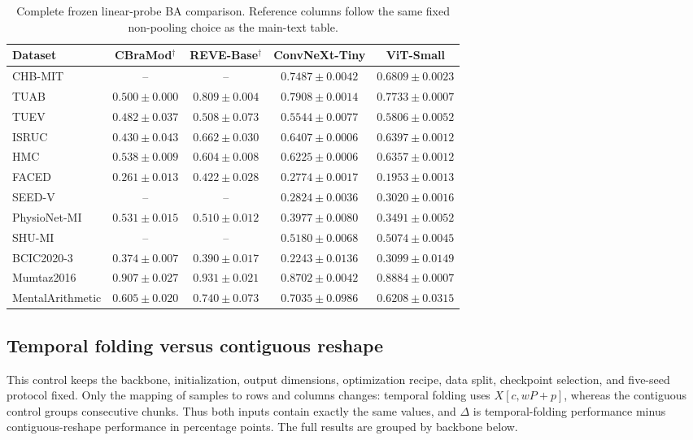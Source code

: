 \begin{table}[tbp]
\centering\scriptsize
\setlength{\tabcolsep}{4pt}
\caption{Complete frozen linear-probe BA comparison. Reference columns follow the same fixed non-pooling choice as the main-text table.}
\label{tab:linear-probe-ba-context}
\begin{tabular}{@{}lcccc@{}}\toprule
Dataset & CBraMod$^\dagger$ & REVE-Base$^\dagger$ & ConvNeXt-Tiny & ViT-Small \\ \midrule
CHB-MIT & -- & -- & $0.7487\pm0.0042$ & $0.6809\pm0.0023$ \\
TUAB & $0.500\pm0.000$ & $0.809\pm0.004$ & $0.7908\pm0.0014$ & $0.7733\pm0.0007$ \\
TUEV & $0.482\pm0.037$ & $0.508\pm0.073$ & $0.5544\pm0.0077$ & $0.5806\pm0.0052$ \\
ISRUC & $0.430\pm0.043$ & $0.662\pm0.030$ & $0.6407\pm0.0006$ & $0.6397\pm0.0012$ \\
HMC & $0.538\pm0.009$ & $0.604\pm0.008$ & $0.6225\pm0.0006$ & $0.6357\pm0.0012$ \\
FACED & $0.261\pm0.013$ & $0.422\pm0.028$ & $0.2774\pm0.0017$ & $0.1953\pm0.0013$ \\
SEED-V & -- & -- & $0.2824\pm0.0036$ & $0.3020\pm0.0016$ \\
PhysioNet-MI & $0.531\pm0.015$ & $0.510\pm0.012$ & $0.3977\pm0.0080$ & $0.3491\pm0.0052$ \\
SHU-MI & -- & -- & $0.5180\pm0.0068$ & $0.5074\pm0.0045$ \\
BCIC2020-3 & $0.374\pm0.007$ & $0.390\pm0.017$ & $0.2243\pm0.0136$ & $0.3099\pm0.0149$ \\
Mumtaz2016 & $0.907\pm0.027$ & $0.931\pm0.021$ & $0.8702\pm0.0042$ & $0.8884\pm0.0007$ \\
MentalArithmetic & $0.605\pm0.020$ & $0.740\pm0.073$ & $0.7035\pm0.0986$ & $0.6208\pm0.0315$ \\
\bottomrule\end{tabular}
\end{table}

\subsection{Temporal folding versus contiguous reshape}\label{app:fold-reshape}
This control keeps the backbone, initialization, output dimensions, optimization
recipe, data split, checkpoint selection, and five-seed protocol fixed. Only the
mapping of samples to rows and columns changes: temporal folding uses
$X[c,wP+p]$, whereas the contiguous control groups consecutive chunks. Thus
both inputs contain exactly the same values, and $\Delta$ is temporal-folding
performance minus contiguous-reshape performance in percentage points. The full
results are grouped by backbone below.


